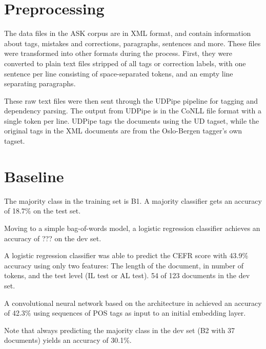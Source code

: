 
\section{Preprocessing}

The data files in the ASK corpus are in XML format, and contain information
about tags, mistakes and corrections, paragraphs, sentences and more. These
files were transformed into other formats during the process. First, they
were converted to plain text files stripped of all tags or correction labels,
with one sentence per line consisting of space-separated tokens, and an empty
line separating paragraphs.

These raw text files were then sent through the UDPipe pipeline for tagging
and dependency parsing. The output from UDPipe is in the CoNLL file format
with a single token per line. UDPipe tags the documents using the UD tagset,
while the original tags in the XML documents are from the Oslo-Bergen
tagger's own tagset.

\section{Baseline}

The majority class in the training set is B1. A majority classifier gets an
accuracy of 18.7\% on the test set.

Moving to a simple bag-of-words model, a logistic regression classifier achieves
an accuracy of ??? on the dev set. 

A logistic regression classifier was able to predict the CEFR score with
43.9\% accuracy using only two features: The length of the document, in
number of tokens, and the test level (IL test or AL test). 54 of 123
documents in the dev set.

A convolutional neural network based on the architecture in
\textcite{zhang2017sensitivity} achieved an accuracy of 42.3\% using
sequences of POS tags as input to an initial embedding layer.

Note that always predicting the majority class in the dev set (B2 with 37
documents) yields an accuracy of 30.1\%.
